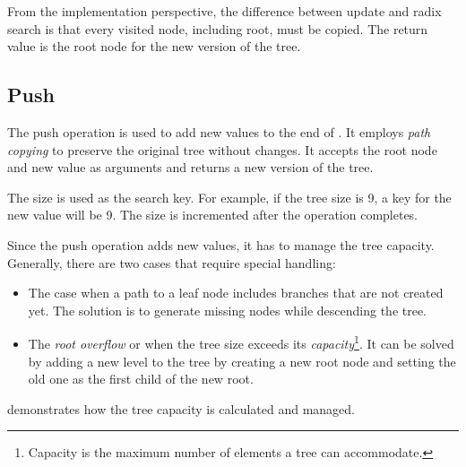 From the implementation perspective, the difference between update and radix search is that every visited node, including root, must be copied. The return value is the root node for the new version of the tree.

\subsection{Push}
The push operation is used to add new values to the end of \treerb{}. It employs \emph{path copying} to preserve the original tree without changes. It accepts the root node and new value as arguments and returns a new version of the tree.

The \treerb{} size is used as the search key. For example, if the tree size is 9, a key for the new value will be 9. The size is incremented after the operation completes.

Since the push operation adds new values, it has to manage the tree capacity. Generally, there are two cases that require special handling:

\begin{itemize}
    \item The case when a path to a leaf node includes branches that are not created yet. The solution is to generate missing nodes while descending the tree.
    \item The \emph{root overflow} or when the tree size exceeds its \emph{capacity}\footnote{Capacity is the maximum number of elements a tree can accommodate.}. It can be solved by adding a new level to the tree by creating a new root node and setting the old one as the first child of the new root.
\end{itemize}

 demonstrates how the tree capacity is calculated and managed.


